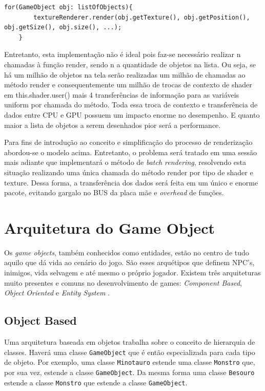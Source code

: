 \documentclass[12pt, 
openright, 
oneside, 
a4paper,    
brazil]{facom-ufu-abntex2}
\begin{document}
\begin{lstlisting}[caption=Demonstração do render]
	for(GameObject obj: listOfObjects){
		textureRenderer.render(obj.getTexture(), obj.getPosition(), obj.getSize(), obj.size(), ...);
	}
\end{lstlisting}

Entretanto, esta implementação não é ideal pois faz-se necessário realizar n chamadas à função render, sendo n a quantidade de objetos na lista. Ou seja, se há um milhão de objetos na tela serão realizadas um milhão de chamadas ao método render e consequentemente um milhão de trocas de contexto de shader em this.shader.user() mais 4 transferências de informação para as variáveis uniform por chamada do método. Toda essa troca de contexto e transferência de dados entre CPU e GPU possuem um impacto enorme no desempenho. E quanto maior a lista de objetos a serem desenhados pior será a performance.

Para fins de introdução ao conceito e simplificação do processo de renderização abordou-se o modelo acima. Entretanto, o problema será tratado em uma sessão mais adiante que implementará o método de \textit{batch rendering}, resolvendo esta situação realizando uma única chamada do método render por tipo de shader e texture. Dessa forma, a transferência dos dados será feita em um único e enorme pacote, evitando gargalo no BUS da placa mãe e \textit{overhead} de funções.

\section{Arquitetura do Game Object}

Os \textit{game objects}, também conhecidos como entidades, estão no centro de tudo aquilo que dá vida ao cenário do jogo. São esses arquétipos que definem NPC's, inimigos, vida selvagem e até mesmo o próprio jogador. Existem três arquiteturas muito presentes e comuns no desenvolvimento de games: \textit{Component Based}, \textit{Object Oriented} e \textit{Entity System} \cite{GameObjectArchitecture}. 

\subsection{Object Based}
Uma arquitetura baseada em objetos trabalha sobre o conceito de hierarquia de classes. Haverá uma classe \texttt{GameObject} que é então especializada para cada tipo de objeto. Por exemplo, uma classe \texttt{Minotauro} estende uma classe \texttt{Monstro} que, por sua vez, estende a classe \texttt{GameObject}. Da mesma forma uma classe \texttt{Besouro} estende a classe \texttt{Monstro} que estende a classe \texttt{GameObject}.
\end{document}
